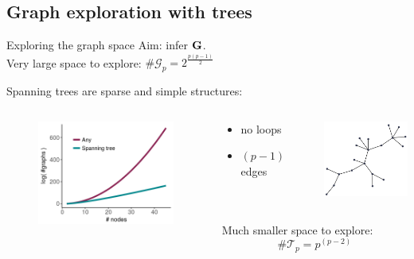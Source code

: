 \documentclass[11pt]{beamer}
\newcommand\Gb{{\bf G}}
\newcommand{\emphase}[1]{\textcolor{Complement}{#1}}
\newcommand{\bleu}[1]{\textcolor{Framableulight}{#1}}
\begin{document}
 \subsection{Graph exploration with trees}
 \begin{frame}{Exploring the graph space}
Aim: infer $\Gb$.\\
Very large space to explore: \emphase{$\text{\#} \mathcal{G}_p = 2^{\frac{p(p-1)}{2}}$}\\
\bigskip
	
	\bleu{Spanning trees} are sparse and simple structures:\\

  \begin{columns}
  \begin{column}{6cm}
	\begin{figure}[htp]
\includegraphics[width=5cm]{images/compar_typegraphs.png}
	\end{figure}
	\end{column}
	 \begin{column}{6cm}
	 \begin{columns}
	 \begin{column}{0.5\linewidth}
	 \begin{itemize}
	 \item no loops
	 \item $(p-1)$ edges
	 \end{itemize}
	 \end{column}
	 \begin{column}{0.5\linewidth}
	 	\includegraphics[width=3cm]{images/tree.png} 
	 \end{column}
	  \end{columns}
 \vspace{0.3cm}
 
Much \bleu{ smaller space} to explore:\\  \emphase{$$\text{\#} \mathcal{T}_p = p^{(p-2)}$$}\\ 
\end{column}
\end{columns}
 \end{frame}
\end{document}
